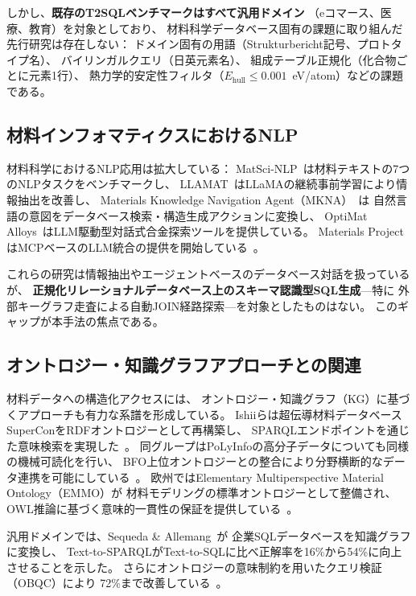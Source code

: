 \documentclass[5p,twocolumn]{elsarticle}
\begin{document}
しかし、\textbf{既存のT2SQLベンチマークはすべて汎用ドメイン}
（eコマース、医療、教育）を対象としており、
材料科学データベース固有の課題に取り組んだ先行研究は存在しない：
ドメイン固有の用語（Strukturbericht記号、プロトタイプ名）、
バイリンガルクエリ（日英元素名）、
組成テーブル正規化（化合物ごとに元素1行）、
熱力学的安定性フィルタ（$E_\text{hull} \leq 0.001$~eV/atom）などの課題である。

\subsection{材料インフォマティクスにおけるNLP}

材料科学におけるNLP応用は拡大している：
MatSci-NLP~\citep{song2023matscnlp}は材料テキストの7つのNLPタスクをベンチマークし、
LLAMAT~\citep{mishra2024llamat}はLLaMAの継続事前学習により情報抽出を改善し、
Materials Knowledge Navigation Agent（MKNA）~\citep{zhuang2026mkna}は
自然言語の意図をデータベース検索・構造生成アクションに変換し、
OptiMat Alloys~\citep{hu2026optimat}はLLM駆動型対話式合金探索ツールを提供している。
Materials ProjectはMCPベースのLLM統合の提供を開始している~\citep{mp_mcp2025}。

これらの研究は情報抽出やエージェントベースのデータベース対話を扱っているが、
\textbf{正規化リレーショナルデータベース上のスキーマ認識型SQL生成}---特に
外部キーグラフ走査による自動JOIN経路探索---を対象としたものはない。
このギャップが本手法の焦点である。

\subsection{オントロジー・知識グラフアプローチとの関連}
\label{sec:ontology_comparison}

材料データへの構造化アクセスには、
オントロジー・知識グラフ（KG）に基づくアプローチも有力な系譜を形成している。
Ishiiらは超伝導材料データベースSuperConをRDFオントロジーとして再構築し、
SPARQLエンドポイントを通じた意味検索を実現した~\citep{ishii2023supercon}。
同グループはPoLyInfoの高分子データについても同様の機械可読化を行い、
BFO上位オントロジーとの整合により分野横断的なデータ連携を可能にしている~\citep{ishii2024polyinfo}。
欧州ではElementary Multiperspective Material Ontology（EMMO）が
材料モデリングの標準オントロジーとして整備され、
OWL推論に基づく意味的一貫性の保証を提供している~\citep{emmo2020}。

汎用ドメインでは、Sequeda \& Allemang~\citep{sequeda2024benchmark}が
企業SQLデータベースを知識グラフに変換し、
Text-to-SPARQLがText-to-SQLに比べ正解率を16\%から54\%に向上させることを示した。
さらにオントロジーの意味制約を用いたクエリ検証（OBQC）により
72\%まで改善している~\citep{allemang2024obqc}。
\end{document}
